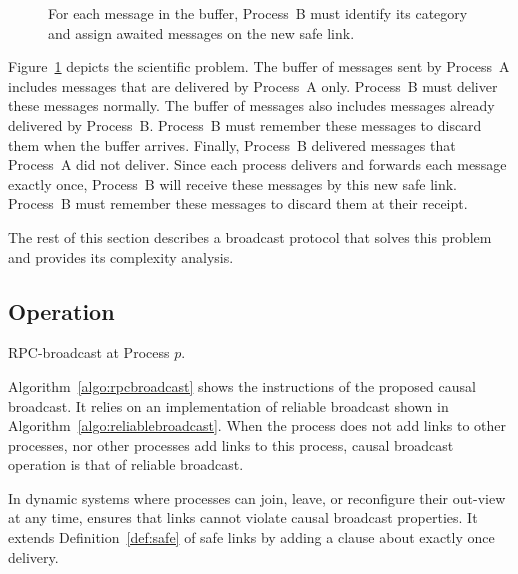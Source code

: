 \begin{figure}
  
  \caption{\label{fig:problemstatement}For each message in the buffer, Process~B
    must identify its category and assign awaited messages on the new safe
    link.}
\end{figure}

Figure~\ref{fig:problemstatement} depicts the scientific problem. The buffer of
messages sent by Process~A includes messages that are delivered by Process~A
only. Process~B must deliver these messages normally. The buffer of messages
also includes messages already delivered by Process~B. Process~B must remember
these messages to discard them when the buffer arrives. Finally, Process~B
delivered messages that Process~A did not deliver. Since each process delivers
and forwards each message exactly once, Process~B will receive these messages by
this new safe link. Process~B must remember these messages to discard them at
their receipt.

The rest of this section describes a broadcast protocol that solves this problem
and provides its complexity analysis.


\subsection{Operation}

\begin{algorithm}[h]
  
  \caption{\label{algo:rpcbroadcast}RPC-broadcast at Process $p$.}
\end{algorithm}


Algorithm~\ref{algo:rpcbroadcast} shows the instructions of the proposed causal
broadcast. It relies on an implementation of reliable broadcast shown in
Algorithm~\ref{algo:reliablebroadcast}. When the process does not add links to
other processes, nor other processes add links to this process, causal broadcast
operation is that of reliable broadcast. 

In dynamic systems where processes can join, leave, or reconfigure their
out-view at any time, \RPCBROADCAST ensures that links cannot violate causal
broadcast properties. It extends Definition~\ref{def:safe} of safe links by
adding a clause about exactly once delivery. 


